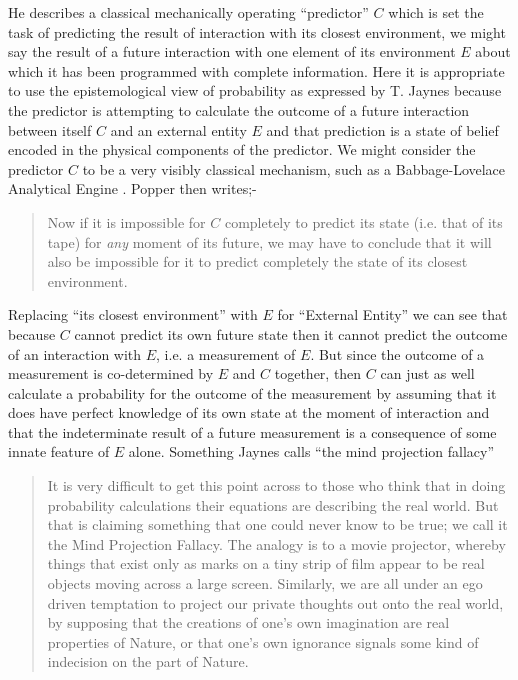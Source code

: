 \par
He describes a classical mechanically operating \enquote{predictor} $C$ which is set the task of
predicting the result of interaction with its closest environment, we might say the result of a
future interaction with one element of its environment $E$ about which it has been programmed
with complete information. Here it is appropriate to use the epistemological view of probability
as expressed by T. Jaynes because the predictor is attempting to calculate the outcome of a
future interaction between itself $C$ and an external entity $E$ and that prediction is a state
of belief encoded in the physical components of the predictor. We might consider the predictor
$C$ to be a very visibly classical mechanism, such as a Babbage-Lovelace Analytical Engine
\autocite{Menabrea1843SketchBabbage}. Popper then writes;-
\begin{quotation}
Now if it is impossible for $C$ completely to predict its state (i.e. that of its tape) for
\emph{any} moment of its future, we may have to conclude that it will also be impossible for it
to predict completely the state of its closest environment.
  \par
\hfill \autocite[p.~178]{Popper1950b}
\end{quotation}
\par
Replacing \enquote{its closest environment} with $E$ for \enquote{External Entity} we can see
that because $C$ cannot predict its own future state then it cannot predict the outcome of an
interaction with $E$, i.e. a measurement of $E$. But since the outcome of a measurement is
co-determined by $E$ and $C$ together, then $C$ can just as well calculate a probability for the
outcome of the measurement by assuming that it does have perfect knowledge of its own state at
the moment of interaction and that the indeterminate result of a future measurement is a
consequence of some innate feature of $E$ alone. Something Jaynes calls
\enquote{the mind projection fallacy}
\begin{quotation}
It is very difficult to get this point across to those who think that in doing probability
calculations their equations are describing the real world. But that is claiming something that
one could never know to be true; we call it the Mind Projection Fallacy. The analogy is to a
movie projector, whereby things that exist only as marks on a tiny strip of film appear to be
real objects moving across a large screen. Similarly, we are all under an ego driven temptation
to project our private thoughts out onto the real world, by supposing that the creations of
one's own imagination are real properties of Nature, or that one's own ignorance signals some
kind of indecision on the part of Nature. \hfill \autocite{Jaynes1989}
\end{quotation}

